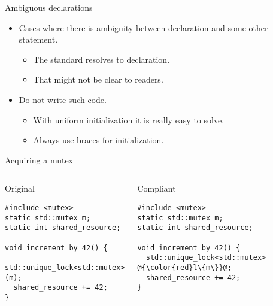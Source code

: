 \begin{frame}[t]{Ambiguous declarations}
\begin{itemize}
  \item Cases where there is ambiguity between declaration and some other statement.
    \begin{itemize}
      \item The standard resolves to declaration.
      \item That might not be clear to readers.
    \end{itemize}

  \vfill
  \item Do not write such code.
    \begin{itemize}
      \item With uniform initialization it is really easy to solve.
      \item Always use braces for initialization.
    \end{itemize}
\end{itemize}
\end{frame}

\begin{frame}[t,fragile]{Acquiring a mutex}
\begin{columns}

\begin{block}{Original}
\begin{lstlisting}
#include <mutex>
static std::mutex m;
static int shared_resource;

void increment_by_42() {
  std::unique_lock<std::mutex>(m);
  shared_resource += 42;
}
\end{lstlisting}
\end{block}

\pause
{}
\begin{block}{Compliant}
\begin{lstlisting}[escapechar=@]
#include <mutex>
static std::mutex m;
static int shared_resource;

void increment_by_42() {
  std::unique_lock<std::mutex> @{\color{red}l\{m\}}@;
  shared_resource += 42;
}
\end{lstlisting}
\end{block}

\end{columns}
\end{frame}

